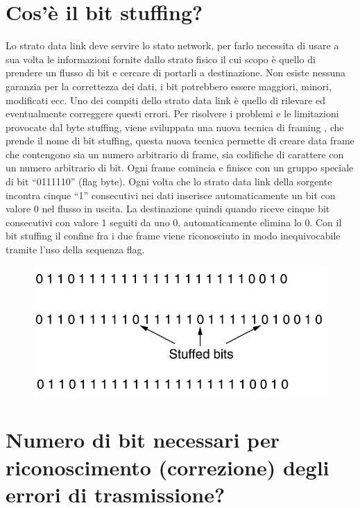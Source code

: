 \section{Cos’è il bit stuffing?}

Lo strato data link deve servire lo stato network, per farlo necessita di usare a sua volta le informazioni fornite dallo strato fisico il cui scopo è quello di prendere un flusso di bit e cercare di portarli a destinazione.
Non esiste nessuna garanzia per la correttezza dei dati, i bit potrebbero essere maggiori, minori, modificati ecc. Uno dei compiti dello strato data link è quello di rilevare ed eventualmente correggere questi errori.
Per risolvere i problemi e le limitazioni provocate dal byte stuffing, viene sviluppata una nuova tecnica di framing , che prende il nome di bit stuffing, questa nuova tecnica permette di creare data frame che contengono sia un numero arbitrario di frame, sia codifiche di carattere con un numero arbitrario di bit.
Ogni frame comincia e finisce con un gruppo speciale di bit “0111110” (flag byte). Ogni volta che lo strato data link della sorgente incontra cinque “1” consecutivi nei dati inserisce automaticamente un bit con valore 0 nel flusso in uscita. La destinazione quindi quando riceve cinque bit consecutivi con valore 1 seguiti da uno 0, automaticamente elimina lo 0.
Con il bit stuffing il confine fra i due frame viene riconosciuto in modo inequivocabile tramite l’uso della sequenza flag.
 
\begin{figure}[H]
\centering
\includegraphics[scale=0.8]{res/img/14_BitStuffing.png}
\end{figure}

\section{Numero di bit necessari per riconoscimento (correzione) degli errori di trasmissione?}


